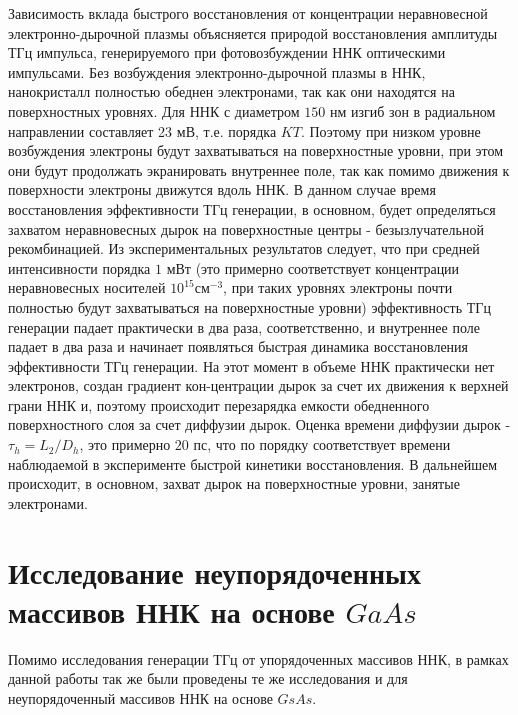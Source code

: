 \documentclass[a4paper,14pt,russian]{extreport}
\begin{document}
					Зависимость вклада быстрого восстановления от концентрации неравновесной электронно-дырочной плазмы объясняется природой восстановления амплитуды ТГц импульса, генерируемого при фотовозбуждении ННК оптическими импульсами. Без возбуждения электронно-дырочной плазмы в ННК, нанокристалл полностью обеднен электронами, так как они находятся на поверхностных уровнях. Для ННК с диаметром $150$ нм изгиб зон в радиальном направлении составляет 23 мВ, т.е. порядка $KT$. Поэтому при низком уровне возбуждения электроны будут захватываться на поверхностные уровни, при этом они будут продолжать экранировать внутреннее поле, так как помимо движения к поверхности электроны движутся вдоль ННК. В данном случае время восстановления эффективности ТГц генерации, в основном, будет определяться захватом неравновесных дырок на поверхностные центры - безызлучательной рекомбинацией.  Из экспериментальных результатов следует, что при средней интенсивности порядка $1 \text{ мВт}$ (это примерно соответствует концентрации неравновесных носителей $10^{15} \text{см}^{-3}$, при таких уровнях электроны почти полностью будут захватываться на поверхностные уровни) эффективность ТГц генерации падает практически в два раза, соответственно, и внутреннее поле падает в два раза и начинает появляться быстрая динамика восстановления эффективности ТГц генерации. На этот момент в объеме ННК практически нет электронов, создан градиент кон-центрации дырок за счет их движения к верхней грани ННК и, поэтому происходит перезарядка емкости обедненного поверхностного слоя за счет диффузии дырок. Оценка времени диффузии дырок - $\tau_h = L_2/D_h$, это примерно $20$ пс, что по порядку соответствует времени наблюдаемой в эксперименте быстрой кинетики восстановления. В дальнейшем происходит, в основном, захват дырок на поверхностные уровни, занятые электронами.
		\section{Исследование неупорядоченных массивов ННК на основе $GaAs$}
			Помимо исследования генерации ТГц от упорядоченных массивов ННК, в рамках данной работы так же были проведены те же исследования и для неупорядоченный массивов ННК на основе $GsAs$.
\end{document}
